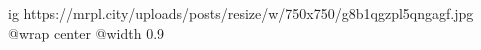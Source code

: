  
 
 
 
 

\ifcmt
  ig https://mrpl.city/uploads/posts/resize/w/750x750/g8b1qgzpl5qngagf.jpg
  @wrap center
  @width 0.9
\fi
